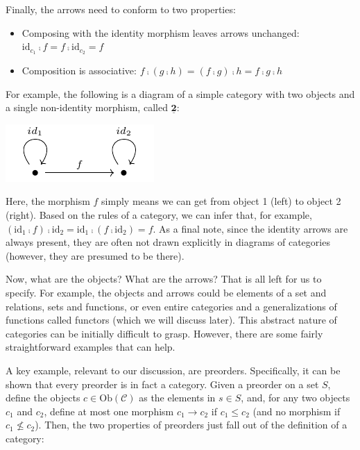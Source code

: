 \documentclass[
]{book}
\providecommand{\tightlist}{%
  \setlength{\itemsep}{0pt}\setlength{\parskip}{0pt}}
\theoremstyle{definition}
\theoremstyle{definition}
\theoremstyle{definition}
\theoremstyle{definition}
\theoremstyle{remark}
\begin{document}
Finally, the arrows need to conform to two properties:

\begin{itemize}
\tightlist
\item
  Composing with the identity morphism leaves arrows unchanged: \(\text{id}_{c_1} ⨾f = f ⨾\text{id}_{c_2} = f\)
\item
  Composition is associative: \(f ⨾(g ⨾h) = (f ⨾g) ⨾h = f ⨾g ⨾h\)
\end{itemize}

For example, the following is a diagram of a simple category with two objects and a single non-identity morphism, called \(\underline{\textbf{2}}\):

\begin{center}\includegraphics[width=1\linewidth,height=1\textheight]{./figures/category-two} \end{center}

Here, the morphism \(f\) simply means we can get from object 1 (left) to object 2 (right). Based on the rules of a category, we can infer that, for example, \((\text{id}_1 ⨾f) ⨾\text{id}_2 = \text{id}_1 ⨾(f ⨾\text{id}_2) = f\). As a final note, since the identity arrows are always present, they are often not drawn explicitly in diagrams of categories (however, they are presumed to be there).

Now, what are the objects? What are the arrows? That is all left for us to specify. For example, the objects and arrows could be elements of a set and relations, sets and functions, or even entire categories and a generalizations of functions called functors (which we will discuss later). This abstract nature of categories can be initially difficult to grasp. However, there are some fairly straightforward examples that can help.

A key example, relevant to our discussion, are preorders. Specifically, it can be shown that every preorder is in fact a category. Given a preorder on a set \(S\), define the objects \(c \in \text{Ob}(\mathcal{C})\) as the elements in \(s \in S\), and, for any two objects \(c_1\) and \(c_2\), define at most one morphism \(c_1 \to c_2\) if \(c_1 \leq c_2\) (and no morphism if \(c_1 \not \leq c_2\)). Then, the two properties of preorders just fall out of the definition of a category:
\end{document}
